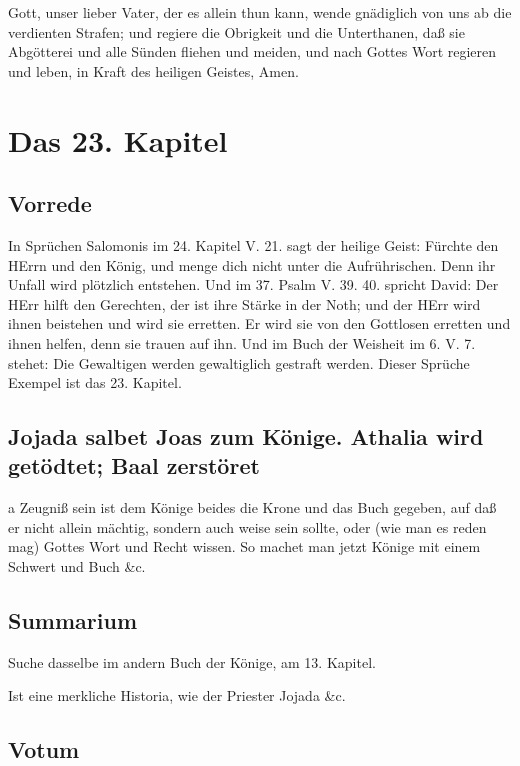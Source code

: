 Gott, unser lieber Vater, der es allein thun kann, wende gnädiglich von uns ab die verdienten Strafen; und regiere die Obrigkeit und die Unterthanen, daß sie Abgötterei und alle Sünden fliehen und meiden, und nach Gottes Wort regieren und leben, in Kraft des heiligen Geistes, Amen.

\chapter{Das 23. Kapitel}

\section{Vorrede}

In Sprüchen Salomonis im 24. Kapitel V. 21. sagt der heilige Geist: Fürchte den HErrn und den König, und menge dich nicht unter die Aufrührischen. Denn ihr Unfall wird plötzlich entstehen. Und im 37. Psalm V. 39. 40. spricht David: Der HErr hilft den Gerechten, der ist ihre Stärke in der Noth; und der HErr wird ihnen beistehen und wird sie erretten. Er wird sie von den Gottlosen erretten und ihnen helfen, denn sie trauen auf ihn. Und im Buch der Weisheit im 6. V. 7. stehet: Die Gewaltigen werden gewaltiglich gestraft werden. Dieser Sprüche Exempel ist das 23. Kapitel.

\section[Jojada salbet Joas zum Könige. Athalia wird getödtet;]{Jojada salbet Joas zum Könige. Athalia wird getödtet; Baal zerstöret}

a Zeugniß sein ist dem Könige beides die Krone und das Buch gegeben, auf daß er nicht allein mächtig, sondern auch weise sein sollte, oder (wie man es reden mag) Gottes Wort und Recht wissen. So machet man jetzt Könige mit einem Schwert und Buch \&c.

\section{Summarium}

Suche dasselbe im andern Buch der Könige, am 13. Kapitel.

Ist eine merkliche Historia, wie der Priester Jojada \&c.

\section{Votum}

